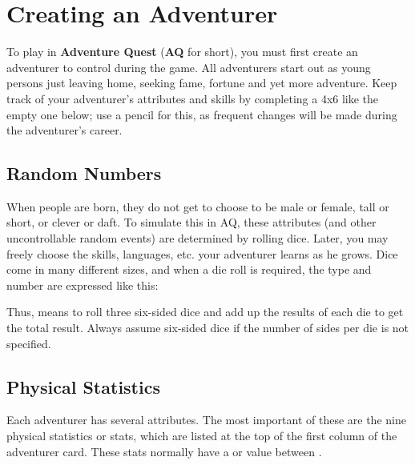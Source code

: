 \chapter{Creating an Adventurer}
\label{ch:create-adventurer}
To play in \textbf{Adventure Quest} (\textbf{AQ} for short), you must first create an adventurer to control during the game. All adventurers start out as young persons just leaving home, seeking fame, fortune and yet more adventure. Keep track of your adventurer's attributes and skills by completing a 4x6  like the empty one below; use a pencil for this, as frequent changes will be made during the adventurer's career.

\smallskip
\setlength{\columnsep}{\defcolwidth}\begin{multicols*}{2}
\section{Random Numbers}
When people are born, they do not get to choose to be male or female, tall or short, or clever or daft. To simulate this in AQ, these attributes (and other uncontrollable random events) are determined by rolling dice. Later, you may freely choose the skills, languages, etc. your adventurer learns as he grows. Dice come in many different sizes, and when a die roll is required, the type and number are expressed like this:
\begin{nscenter}
\end{nscenter}
Thus,  means to roll three six-sided dice and add up the results of each die to get the total result. Always assume six-sided dice if the number of sides per die is not specified.
\section{Physical Statistics}

Each adventurer has several attributes. The most important of these are the nine physical statistics or stats, which are listed at the top of the first column of the adventurer card. These stats normally have a  or value between .


\end{multicols*}
